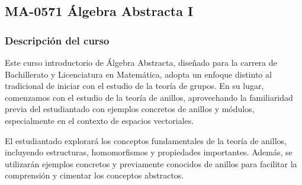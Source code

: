 \newpage
\subsection*{MA-0571 Álgebra Abstracta I}

\hypertarget{MA0571}{}
\begin{refsection}
\begin{table}[H]
\end{table}



\subsubsection*{Descripción del curso}

Este curso introductorio de Álgebra Abstracta, diseñado para la carrera de Bachillerato y Licenciatura en Matemática, adopta un enfoque distinto al tradicional de iniciar con el estudio de la teoría de grupos. En su lugar, comenzamos con el estudio de la teoría de anillos, aprovechando la familiaridad previa del estudiantado con ejemplos concretos de anillos y módulos, especialmente en el contexto de espacios vectoriales.

El estudiantado explorará los conceptos fundamentales de la teoría de anillos, incluyendo estructuras, homomorfismos y propiedades importantes. Además, se utilizarán ejemplos concretos y previamente conocidos de anillos para facilitar la comprensión y cimentar los conceptos abstractos. 


\end{refsection}
